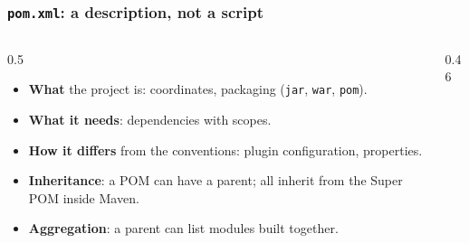 \documentclass[aspectratio=169,10pt,compress]{beamer}
\begin{document}
\begin{frame}[t,fragile] \frametitle{\texttt{pom.xml}: a description, not a script}
  \begin{columns}[T]
    \begin{column}{0.5\textwidth}
      \begin{itemize}\small
        \item \textbf{What} the project is: coordinates, packaging (\texttt{jar}, \texttt{war}, \texttt{pom}).
        \item \textbf{What it needs}: dependencies with scopes.
        \item \textbf{How it differs} from the conventions: plugin configuration, properties.
        \item \textbf{Inheritance}: a POM can have a parent; all inherit from the Super POM inside Maven.
        \item \textbf{Aggregation}: a parent can list modules built together.
      \end{itemize}
    \end{column}
    \begin{column}{0.46\textwidth}
      \begin{center}
      \end{center}
    \end{column}
  \end{columns}
\end{frame}
\end{document}
